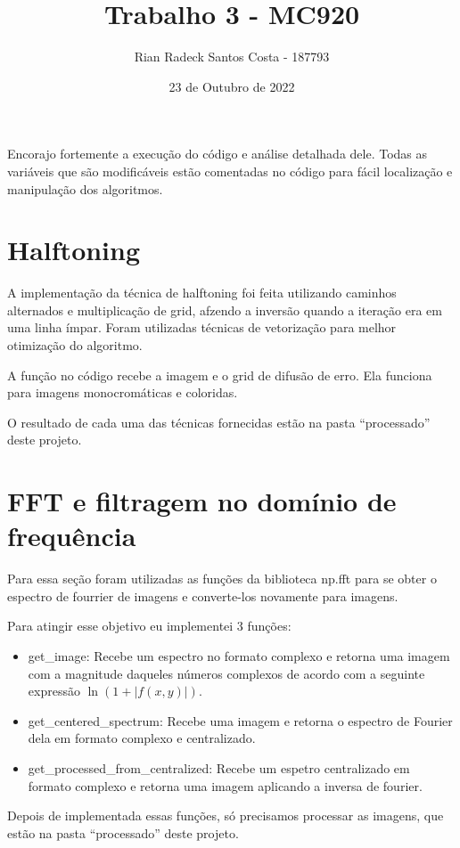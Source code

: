 \documentclass[12pt, letterpaper]{article}
\title{Trabalho 3 - MC920}
\author{Rian Radeck Santos Costa - 187793}
\date{23 de Outubro de 2022}
\begin{document}
\maketitle
\newpage

Encorajo fortemente a execução do código e análise detalhada dele. Todas as variáveis que são modificáveis estão comentadas no código para fácil localização e manipulação dos algoritmos.

\section{Halftoning}
	A implementação da técnica de halftoning foi feita utilizando caminhos alternados e multiplicação de grid, afzendo a inversão quando a iteração era em uma linha ímpar. Foram utilizadas técnicas de vetorização para melhor otimização do algoritmo.

	A função no código recebe a imagem e o grid de difusão de erro. Ela funciona para imagens monocromáticas e coloridas.

	O resultado de cada uma das técnicas fornecidas estão na pasta ``processado'' deste projeto.

\section{FFT e filtragem no domínio de frequência}
	Para essa seção foram utilizadas as funções da biblioteca np.fft para se obter o espectro de fourrier de imagens e converte-los novamente para imagens.

	Para atingir esse objetivo eu implementei 3 funções:
	\begin{itemize}
		\item{get\_image: Recebe um espectro no formato complexo e retorna uma imagem com a magnitude daqueles números complexos de acordo com a seguinte expressão $\ln{(1 + \lvert f(x, y) \rvert)}$.}
		\item{get\_centered\_spectrum: Recebe uma imagem e retorna o espectro de Fourier dela em formato complexo e centralizado.}
		\item{get\_processed\_from\_centralized: Recebe um espetro centralizado em formato complexo e retorna uma imagem aplicando a inversa de fourier.}
	\end{itemize}

	Depois de implementada essas funções, só precisamos processar as imagens, que estão na pasta ``processado'' deste projeto.
\end{document}
